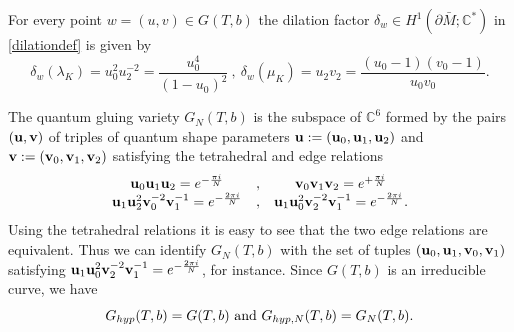 \documentclass[11pt]{amsart}
\newcommand{\mc}{\mathbb{C}}
\newcommand{\bu}{{\bf u}}
\newcommand{\bv}{{\bf v}}
\begin{document}
{For every point $w=(u,v)\in G(T,b)$ the dilation factor $\delta_{w}\in H^1(\partial \bar M; \mc^*)$ in \eqref{dilationdef} is given by  
\begin{equation}\label{longmerformdec25}
\delta_{w}(\lambda_K) = u_0^2u_2^{-2} = \frac{u_0^4}{(1-u_0)^2}\ ,\ \delta_{w}(\mu_K) = u_2v_2 = \frac{(u_0-1)(v_0-1)}{u_0v_0}.
\end{equation}

The quantum gluing variety $G_N(T,b)$ is the subspace of $\mc^6$ formed by the pairs $(\bu,\bv)$ of triples of quantum shape parameters $\bu:=(\bu_0,\bu_1,\bu_2)$ and  $\bv:=(\bv_0,\bv_1,\bv_2)$ satisfying the tetrahedral and edge relations
\begin{equation}\label{eqGN}
\begin{array}{ccc} \bu_0\bu_1\bu_2 =  e^{-\frac{\pi i}{N}} & ,& \bv_0\bv_1\bv_2 =  e^{+\frac{\pi i}{N}}\\
\bu_1\bu_2^2\bv_0^{-2}\bv_1^{-1} = e^{-\frac{2\pi i}{N}} & ,&  \bu_1\bu_0^2\bv_2^{-2}\bv_1^{-1}= e^{-\frac{2\pi i}{N}}.
\end{array}
\end{equation}
Using the tetrahedral relations it is easy to see that the two edge relations are equivalent. Thus we can identify $G_N(T,b)$ with the set of tuples $(\bu_0,\bu_1,\bv_0,\bv_1)$ satisfying $\bu_1\bu_0^2\bv_2^{-2}\bv_1^{-1}= e^{-\frac{2\pi i}{N}}$, for instance. Since $G(T,b)$ is an irreducible curve, we have
\begin{equation}\label{Ghypcas41mars25}
G_{hyp}(T,b)=G(T,b)\ {\rm and}\ G_{hyp,N}(T,b)=G_N(T,b).
\end{equation}

}
\end{document}
